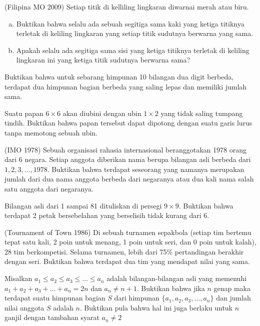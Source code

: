 \documentclass[11pt]{scrartcl}
\begin{document}
    \begin{problem}
        (Filipina MO 2009) Setiap titik di kelliling lingkaran diwarnai merah atau biru. 
        \begin{enumerate}[a.]
            \item Buktikan bahwa selalu ada sebuah segitiga sama kaki yang ketiga titiknya terletak di keliling lingkaran yang setiap titik sudutnya berwarna yang sama.
            \item Apakah selalu ada segitiga sama sisi yang ketiga titiknya terletak di keliling lingkaran ini yang ketiga titik sudutnya berwarna sama?
        \end{enumerate}
    \end{problem}
    
    \begin{problem}
        Buktikan bahwa untuk sebarang himpunan 10 bilangan dua digit berbeda, terdapat dua himpunan bagian berbeda yang saling lepas dan memiliki jumlah sama.    
    \end{problem}

    \begin{problem}
        Suatu papan $6 \times 6$ akan diubini dengan ubin $1 \times 2$ yang tidak saling tumpang tindih. Buktikan bahwa papan tersebut dapat dipotong dengan suatu garis lurus tanpa memotong sebuah ubin.    
    \end{problem}
    
    \begin{problem}
        (IMO 1978) Sebuah organisasi rahasia internasional beranggotakan 1978 orang dari 6 negara. Setiap anggota diberikan nama berupa bilangan asli berbeda dari $1,2,3,...,1978$. Buktikan bahwa terdapat seseorang yang namanya merupakan jumlah dari dua nama anggota berbeda dari negaranya atau dua kali nama salah satu anggota dari negaranya.    
    \end{problem}
    
    \begin{problem}
        Bilangan asli dari 1 sampai 81 dituliskan di persegi $9 \times 9$. Buktikan bahwa terdapat 2 petak bersebelahan yang berselisih tidak kurang dari 6.    
    \end{problem}
    
    \begin{problem}
        (Tournament of Town 1986) Di sebuah turnamen sepakbola (setiap tim bertemu tepat satu kali, 2 poin untuk menang, 1 poin untuk seri, dan 0 poin untuk kalah), 28 tim berkompetisi. Selama turnamen, lebih dari 75\% pertandingan berakhir dengan seri. Buktikan bahwa terdapat dua tim yang mendapat nilai yang sama.     
    \end{problem}
    
    \begin{problem}
        Misalkan $a_1 \leq a_2 \leq a_3 \leq ... \leq a_n$ adalah bilangan-bilangan asli yang memenuhi $a_1+a_2+a_3+...+a_n=2n$ dan $a_n \neq n+1$. Buktikan bahwa jika $n$ genap maka terdapat suatu himpunan bagian $S$ dari himpunan $\{a_1,a_2,a_3,...,a_n\}$ dan jumlah nilai anggota $S$ adalah $n$. Buktikan pula bahwa hal ini juga berlaku untuk $n$ ganjil dengan tambahan syarat $a_n \neq 2$    
    \end{problem}
\end{document}
